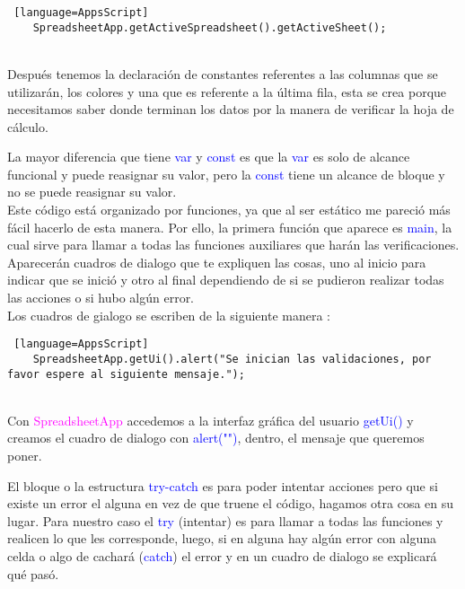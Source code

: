 \documentclass[12pt]{article} %
\begin{document}
    \begin{lstlisting} [language=AppsScript]
    SpreadsheetApp.getActiveSpreadsheet().getActiveSheet();
    \end{lstlisting} \\

    Después tenemos la declaración de constantes referentes a las columnas que se utilizarán, los colores y una que es referente a la última fila, esta se crea porque necesitamos saber donde terminan los datos por la manera de verificar la hoja de cálculo.
    
    La mayor diferencia que tiene \textcolor{blue}{var} y \textcolor{blue}{const} es que la \textcolor{blue}{var} es solo de alcance funcional y puede reasignar su valor, pero la \textcolor{blue}{const} tiene un alcance de bloque y no se puede reasignar su valor. \\

    Este código está organizado por funciones, ya que al ser estático me pareció más fácil hacerlo de esta manera. Por ello, la primera función que aparece es \textcolor{blue}{main}, la cual sirve para llamar a todas las funciones auxiliares que harán las verificaciones. \\

    Aparecerán cuadros de dialogo que te expliquen las cosas, uno al inicio para indicar que se inició y otro al final dependiendo de si se pudieron realizar todas las acciones o si hubo algún error. \\

    Los cuadros de gialogo se escriben de la siguiente manera : 

    \begin{lstlisting} [language=AppsScript]
    SpreadsheetApp.getUi().alert("Se inician las validaciones, por favor espere al siguiente mensaje.");
    \end{lstlisting} \\

    Con \textcolor{magenta}{SpreadsheetApp} accedemos a la interfaz gráfica del usuario \textcolor{blue}{getUi()} y creamos el cuadro de dialogo con \textcolor{blue}{alert("")}, dentro, el mensaje que queremos poner.

    El bloque o la estructura \textcolor{blue}{try-catch} es para poder intentar acciones pero que si existe un error el alguna en vez de que truene el código, hagamos otra cosa en su lugar. Para nuestro caso el \textcolor{blue}{try} (intentar) es para llamar a todas las funciones y realicen lo que les corresponde, luego, si en alguna hay algún error con alguna celda o algo de cachará (\textcolor{blue}{catch}) el error y en un cuadro de dialogo se explicará qué pasó.\\
\end{document}
